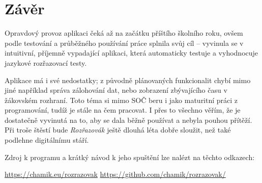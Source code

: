 \chapter*{Závěr}

Opravdový provoz aplikaci čeká až na začátku příštího školního roku, ovšem podle testování a průběžného používání práce splnila svůj cíl -- vyvinula se v intuitivní, příjemně vypadající aplikaci, která automaticky testuje a vyhodnocuje jazykové rozřazovací testy. 

Aplikace má i své nedostatky; z původně plánovaných funkcionalit chybí mimo jiné například správa zálohování dat, nebo zobrazení zbývajícího času v žákovském rozhraní. Toto téma si mimo SOČ beru i jako maturitní práci z programování, tudíž je stále na čem pracovat. I přes to všechno věřím, že je dostatečně vyvinutá na to, aby se dala běžně používat a nebyla pouhou přítěží. Při troše štěstí bude \textit{Rozřazovák} ještě dlouhá léta dobře sloužit, než také podlehne digitálnímu stáří.

Zdroj k programu a krátký návod k jeho spuštění lze nalézt na těchto odkazech:

\href{https://chamik.eu/rozrazovak}{https://chamik.eu/rozrazovak} \newline
\href{https://github.com/chamik/rozrazovak/}{https://github.com/chamik/rozrazovak/}